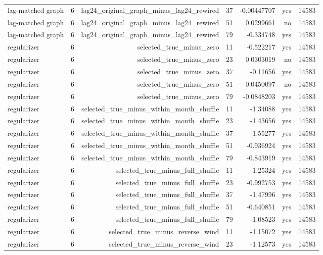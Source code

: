\begin{tabular}{lrrrrrr}
lag-matched graph & 6 & lag24\_original\_graph\_minus\_lag24\_rewired & 37 & -0.00447707 & yes & 14583 \\
lag-matched graph & 6 & lag24\_original\_graph\_minus\_lag24\_rewired & 51 & 0.0299661 & no & 14583 \\
lag-matched graph & 6 & lag24\_original\_graph\_minus\_lag24\_rewired & 79 & -0.334748 & yes & 14583 \\
regularizer & 6 & selected\_true\_minus\_zero & 11 & -0.522217 & yes & 14583 \\
regularizer & 6 & selected\_true\_minus\_zero & 23 & 0.0303019 & no & 14583 \\
regularizer & 6 & selected\_true\_minus\_zero & 37 & -0.11656 & yes & 14583 \\
regularizer & 6 & selected\_true\_minus\_zero & 51 & 0.0450097 & no & 14583 \\
regularizer & 6 & selected\_true\_minus\_zero & 79 & -0.0848203 & yes & 14583 \\
regularizer & 6 & selected\_true\_minus\_within\_month\_shuffle & 11 & -1.34088 & yes & 14583 \\
regularizer & 6 & selected\_true\_minus\_within\_month\_shuffle & 23 & -1.43656 & yes & 14583 \\
regularizer & 6 & selected\_true\_minus\_within\_month\_shuffle & 37 & -1.55277 & yes & 14583 \\
regularizer & 6 & selected\_true\_minus\_within\_month\_shuffle & 51 & -0.936924 & yes & 14583 \\
regularizer & 6 & selected\_true\_minus\_within\_month\_shuffle & 79 & -0.843919 & yes & 14583 \\
regularizer & 6 & selected\_true\_minus\_full\_shuffle & 11 & -1.25324 & yes & 14583 \\
regularizer & 6 & selected\_true\_minus\_full\_shuffle & 23 & -0.992753 & yes & 14583 \\
regularizer & 6 & selected\_true\_minus\_full\_shuffle & 37 & -1.47996 & yes & 14583 \\
regularizer & 6 & selected\_true\_minus\_full\_shuffle & 51 & -0.640851 & yes & 14583 \\
regularizer & 6 & selected\_true\_minus\_full\_shuffle & 79 & -1.08523 & yes & 14583 \\
regularizer & 6 & selected\_true\_minus\_reverse\_wind & 11 & -1.15072 & yes & 14583 \\
regularizer & 6 & selected\_true\_minus\_reverse\_wind & 23 & -1.12573 & yes & 14583 \\

\end{tabular}
